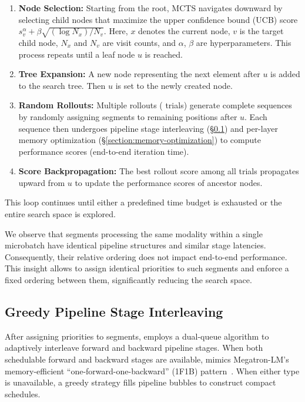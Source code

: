 \begin{enumerate}
    \item \textbf{Node Selection:} Starting from the root, MCTS navigates downward by selecting child nodes that maximize the upper confidence bound (UCB) score $s_v^\alpha + \beta\sqrt{(\log{N_x}) / N_v}$.
    Here, $x$ denotes the current node, $v$ is the target child node, $N_x$ and $N_v$ are visit counts, and $\alpha$, $\beta$ are hyperparameters.
    This process repeats until a leaf node $u$ is reached.

    \item \textbf{Tree Expansion:} A new node representing the next element after $u$ is added to the search tree.
    Then $u$ is set to the newly created node.

    \item \textbf{Random Rollouts:} Multiple rollouts ( trials) generate complete sequences by randomly assigning segments to remaining positions after $u$.
    Each sequence then undergoes pipeline stage interleaving (\S\ref{section:stage-interleaving}) and per-layer memory optimization (\S\ref{section:memory-optimization}) to compute performance scores (\ie end-to-end iteration time).

    \item \textbf{Score Backpropagation:} The best rollout score among all trials propagates upward from $u$ to update the performance scores of ancestor nodes.
\end{enumerate}

This loop continues until either a predefined time budget is exhausted or the entire search space is explored.

We observe that segments processing the same modality within a single microbatch have identical pipeline structures and similar stage latencies.
Consequently, their relative ordering does not impact end-to-end performance.
This insight allows \sys{} to assign identical priorities to such segments and enforce a fixed ordering between them, significantly reducing the search space.

\subsection{Greedy Pipeline Stage Interleaving}
\label{section:stage-interleaving}

After assigning priorities to segments,
\sys{} employs a dual-queue algorithm to adaptively interleave forward and backward pipeline stages.
When both schedulable forward and backward stages are available,
\sys{} mimics Megatron-LM's memory-efficient ``one-\-forward-\-one-\-backward'' (1F1B) pattern~\cite{megatron-lm-arxiv20,dynapipe-eurosys24}.
When either type is unavailable,
a greedy strategy fills pipeline bubbles to construct compact schedules.


